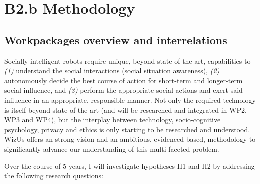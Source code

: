 \documentclass[11pt,a4paper]{report}
\newcommand{\project}{WizUs\xspace}
\newcommand{\eu}[1]{}
\begin{document}
\chapter{B2.b Methodology}\label{research-methodology}

\eu{Describe the proposed methodology in detail including any key intermediate
goals. Explain and justify the methodology in relation to the state of the art,
and particularly novel or unconventional aspects addressing the
'high-risk/high-gain' balance. Highlight any intermediate stages where results
may require adjustments to the project planning. In case you ask that team
members are engaged by another host institution their participation has to be
fully justified by the scientific added value they bring to the project.}

\section{Workpackages overview and interrelations}\label{workpackage-interrelations}

Socially intelligent robots require unique, beyond state-of-the-art,
capabilities to \emph{(1)} understand the social interactions (social
situation awareness), \emph{(2)} autonomously decide the best course of action for
short-term and longer-term social influence, and \emph{(3)} perform the
appropriate social actions and exert said influence in an appropriate,
responsible manner.
Not only the required technology is itself beyond state-of-the-art (and will be
researched and integrated in WP2, WP3 and WP4), but the
interplay between technology, socio-cognitive psychology, privacy and ethics is
only starting to be researched and understood. \project offers an
strong vision and an ambitious, evidenced-based, methodology to significantly
advance our understanding of this multi-faceted problem.

Over the course of 5 years, I will investigate hypotheses H1 and H2
by addressing the following research questions:
\end{document}
